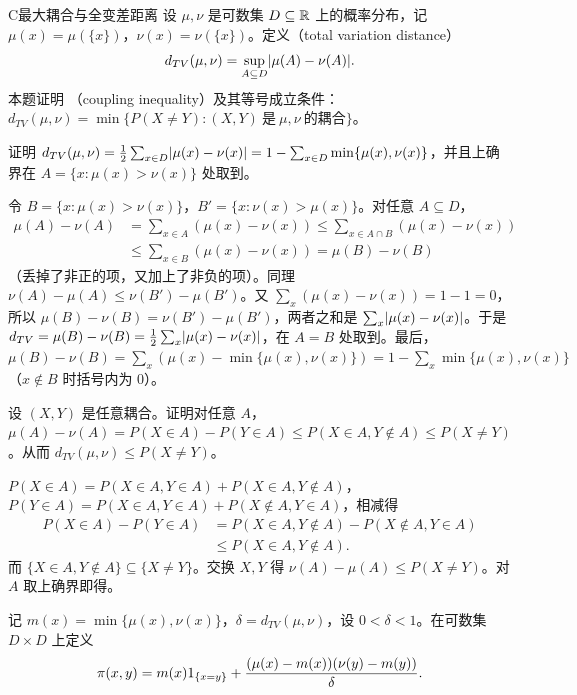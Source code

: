 \begin{probleme}{C}{最大耦合与全变差距离}
设 $\mu,\nu$ 是可数集 $D\subseteq\mathbb{R}$ 上的概率分布，记 $\mu(x)=\mu(\{x\})$，$\nu(x)=\nu(\{x\})$。定义（total variation distance）
\[
d_{TV}(\mu,\nu)=\sup_{A\subseteq D}\lvert \mu(A)-\nu(A)\rvert.
\]
本题证明 （coupling inequality）及其等号成立条件：$d_{TV}(\mu,\nu)=\min\{P(X\neq Y):(X,Y)\ \text{是}\ \mu,\nu\ \text{的耦合}\}$。
\begin{questions}
\item 证明 $d_{TV}(\mu,\nu)=\frac12\sum_{x\in D}\lvert \mu(x)-\nu(x)\rvert=1-\sum_{x\in D}\min\{\mu(x),\nu(x)\}$，并且上确界在 $A=\{x:\mu(x)>\nu(x)\}$ 处取到。
\begin{solution}
令 $B=\{x:\mu(x)>\nu(x)\}$，$B'=\{x:\nu(x)>\mu(x)\}$。对任意 $A\subseteq D$，
\[
\begin{aligned}
\mu(A)-\nu(A)&=\sum_{x\in A}(\mu(x)-\nu(x))\leqslant\sum_{x\in A\cap B}(\mu(x)-\nu(x))\\
&\leqslant\sum_{x\in B}(\mu(x)-\nu(x))=\mu(B)-\nu(B)
\end{aligned}
\]
（丢掉了非正的项，又加上了非负的项）。同理 $\nu(A)-\mu(A)\leqslant\nu(B')-\mu(B')$。又 $\sum_x(\mu(x)-\nu(x))=1-1=0$，所以 $\mu(B)-\nu(B)=\nu(B')-\mu(B')$，两者之和是 $\sum_x\lvert \mu(x)-\nu(x)\rvert$。于是 $d_{TV}=\mu(B)-\nu(B)=\frac12\sum_x\lvert \mu(x)-\nu(x)\rvert$，在 $A=B$ 处取到。最后，$\mu(B)-\nu(B)=\sum_x(\mu(x)-\min\{\mu(x),\nu(x)\})=1-\sum_x\min\{\mu(x),\nu(x)\}$（$x\notin B$ 时括号内为 $0$）。
\end{solution}
\item 设 $(X,Y)$ 是任意耦合。证明对任意 $A$，$\mu(A)-\nu(A)=P(X\in A)-P(Y\in A)\leqslant P(X\in A,Y\notin A)\leqslant P(X\neq Y)$。从而 $d_{TV}(\mu,\nu)\leqslant P(X\neq Y)$。
\begin{solution}
$P(X\in A)=P(X\in A,Y\in A)+P(X\in A,Y\notin A)$，$P(Y\in A)=P(X\in A,Y\in A)+P(X\notin A,Y\in A)$，相减得
\[
\begin{aligned}
P(X\in A)-P(Y\in A)&=P(X\in A,Y\notin A)-P(X\notin A,Y\in A)\\
&\leqslant P(X\in A,Y\notin A).
\end{aligned}
\]
而 $\{X\in A,Y\notin A\}\subseteq\{X\neq Y\}$。交换 $X,Y$ 得 $\nu(A)-\mu(A)\leqslant P(X\neq Y)$。对 $A$ 取上确界即得。
\end{solution}
\item 记 $m(x)=\min\{\mu(x),\nu(x)\}$，$\delta=d_{TV}(\mu,\nu)$，设 $0<\delta<1$。在可数集 $D\times D$ 上定义
\[
\pi(x,y)=m(x)1_{\{x=y\}}+\frac{(\mu(x)-m(x))(\nu(y)-m(y))}{\delta}.
\]
\end{questions}
\end{probleme}
